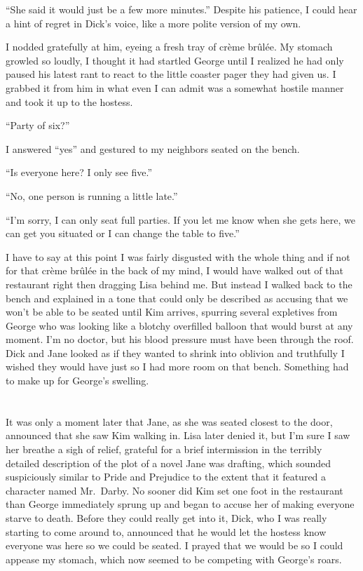 \documentclass[]{book}
\begin{document}
``She said it would just be a few more minutes.'' Despite his patience,
I could hear a hint of regret in Dick's voice, like a more polite
version of my own.

I nodded gratefully at him, eyeing a fresh tray of crème brûlée. My
stomach growled so loudly, I thought it had startled George until I
realized he had only paused his latest rant to react to the little
coaster pager they had given us. I grabbed it from him in what even I
can admit was a somewhat hostile manner and took it up to the hostess.

``Party of six?''

I answered ``yes'' and gestured to my neighbors seated on the bench.

``Is everyone here? I only see five.''

``No, one person is running a little late.''

``I'm sorry, I can only seat full parties. If you let me know when she
gets here, we can get you situated or I can change the table to five.''

I have to say at this point I was fairly disgusted with the whole thing
and if not for that crème brûlée in the back of my mind, I would have
walked out of that restaurant right then dragging Lisa behind me. But
instead I walked back to the bench and explained in a tone that could
only be described as accusing that we won't be able to be seated until
Kim arrives, spurring several expletives from George who was looking
like a blotchy overfilled balloon that would burst at any moment. I'm no
doctor, but his blood pressure must have been through the roof. Dick and
Jane looked as if they wanted to shrink into oblivion and truthfully I
wished they would have just so I had more room on that bench. Something
had to make up for George's swelling.

\chapter{}\label{section-5}

It was only a moment later that Jane, as she was seated closest to the
door, announced that she saw Kim walking in. Lisa later denied it, but
I'm sure I saw her breathe a sigh of relief, grateful for a brief
intermission in the terribly detailed description of the plot of a novel
Jane was drafting, which sounded suspiciously similar to Pride and
Prejudice to the extent that it featured a character named Mr.~Darby. No
sooner did Kim set one foot in the restaurant than George immediately
sprung up and began to accuse her of making everyone starve to death.
Before they could really get into it, Dick, who I was really starting to
come around to, announced that he would let the hostess know everyone
was here so we could be seated. I prayed that we would be so I could
appease my stomach, which now seemed to be competing with George's
roars.
\end{document}
